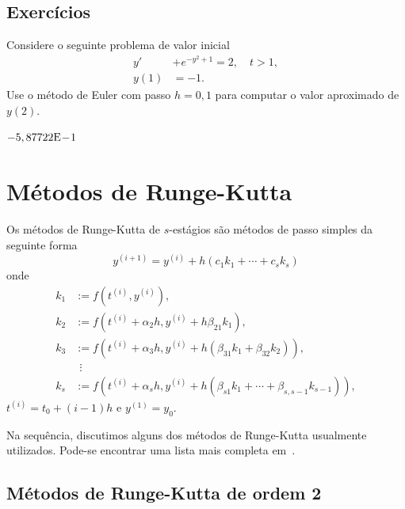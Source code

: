 \subsection*{Exercícios}

\begin{exer}
  Considere o seguinte problema de valor inicial
  \begin{align}
    y' &+ e^{-y^2+1} = 2,\quad t>1,\\
    y(1) &= -1.
  \end{align}
Use o método de Euler com passo $h=0,1$ para computar o valor aproximado de $y(2)$.
\end{exer}
\begin{resp}
  $-5,87722\mathrm{E}\!-\!1$
\end{resp}


\section{Métodos de Runge-Kutta}\label{cap_pvi_sec_RK}

Os métodos de Runge-Kutta de $s$-estágios são métodos de passo simples da seguinte forma
\begin{equation}
  y^{(i+1)} = y^{(i)} + h(c_1k_1 + \cdots + c_sk_s)
\end{equation}
onde
\begin{align}
  k_1 &:= f(t^{(i)},y^{(i)}),\\
  k_2 &:= f(t^{(i)}+\alpha_2h,y^{(i)}+h\beta_{21}k_1),\\
  k_3 &:= f(t^{(i)}+\alpha_3h,y^{(i)}+h(\beta_{31}k_1+\beta_{32}k_2)),\\
      &~~\vdots\\
  k_s &:= f(t^{(i)}+\alpha_sh,y^{(i)}+h(\beta_{s1}k_1+\cdots+\beta_{s,s-1}k_{s-1})),
\end{align}
$t^{(i)}=t_0+(i-1)h$ e $y^{(1)}=y_0$.

Na sequência, discutimos alguns dos métodos de Runge-Kutta usualmente utilizados. Pode-se encontrar uma lista mais completa em~\cite[Cap. 8, Seç. 3.2]{Isaacson1994a}.

\subsection{Métodos de Runge-Kutta de ordem 2}

